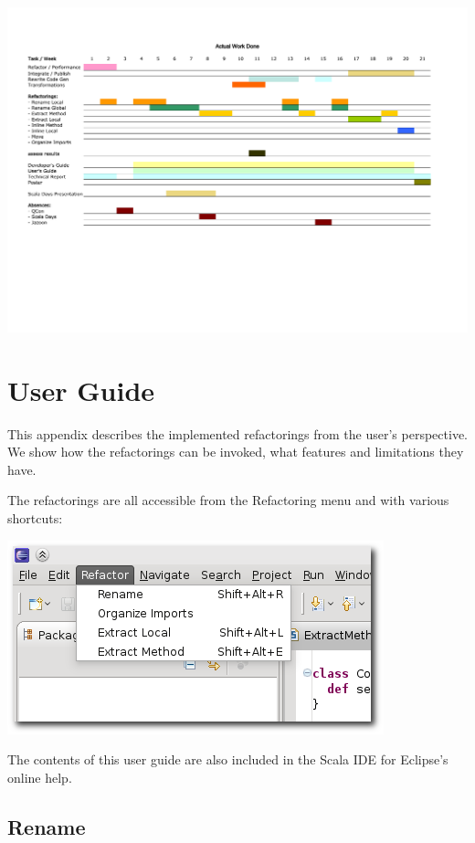 \documentclass[10pt,a4paper,oneside]{scrreprt}
\begin{document}
\newpage
\thispagestyle{empty}
\begin{center}
  \includegraphics[width=1.7\linewidth,angle=90]{project_plan_2.pdf}

\label{end-chapter:project-environment}
\end{center}


\chapter{User Guide} \label{chapter:user-guide}

This appendix describes the implemented refactorings from the user's perspective. We show how the refactorings can be invoked, what features and limitations they have.

The refactorings are all accessible from the Refactoring menu and with various shortcuts:

\begin{center}
  \includegraphics[width=0.6\linewidth]{refactoring-menu-screenshot.png}
\end{center}

The contents of this user guide are also included in the Scala IDE for Eclipse's online help.

\section{Rename}
\end{document}
